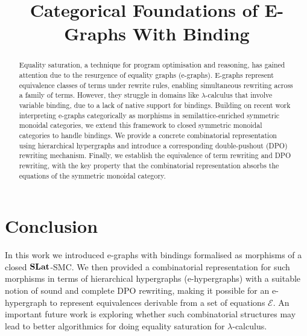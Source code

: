 \documentclass[acmsmall,screen, nonacm, review, anonymous, authoryear]{acmart}
\title{Categorical Foundations of E-Graphs With Binding}
\begin{document}
\begin{abstract}
    Equality saturation, a technique for program optimisation and reasoning, has gained attention due to the resurgence of equality graphs (e-graphs). 
	E-graphs represent equivalence classes of terms under rewrite rules, enabling simultaneous rewriting across a family of terms. 
	However, they struggle in domains like $\lambda$-calculus that involve variable binding, due to a lack of native support for bindings.
	Building on recent work interpreting e-graphs categorically as morphisms in semilattice-enriched symmetric monoidal categories, we extend this framework to closed symmetric monoidal categories to handle bindings. 
	We provide a concrete combinatorial representation using hierarchical hypergraphs and introduce a corresponding double-pushout (DPO) rewriting mechanism. 
	Finally, we establish the equivalence of term rewriting and DPO rewriting, with the key property that the combinatorial representation absorbs the equations of the symmetric monoidal category.
\end{abstract}

\maketitle







\section{Conclusion}
In this work we introduced e-graphs with bindings formalised as morphisms of a closed $\mathbf{SLat}$-SMC.
We then provided a combinatorial representation for such morphisms in terms of hierarchical hypergraphs (e-hypergraphs) with a suitable notion of sound and complete DPO rewriting, making it possible for an e-hypergraph to represent equivalences derivable from a set of equations $\mathcal{E}$.
An important future work is exploring whether such combinatorial structures may lead to better algorithmics for doing equality saturation for $\lambda$-calculus.




\appendix

% 
\end{document}

